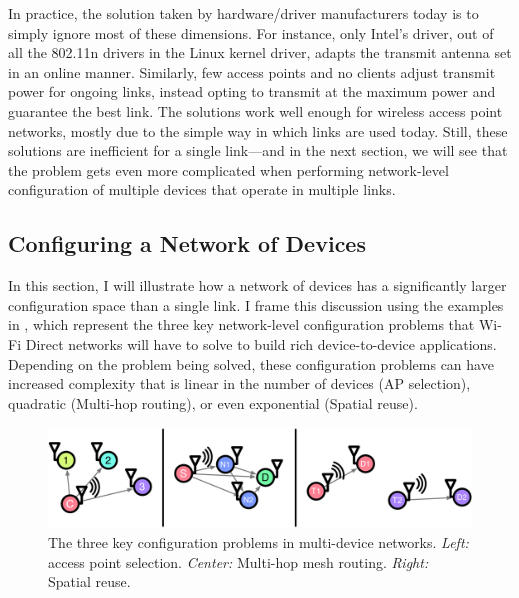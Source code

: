 In practice, the solution taken by hardware/driver manufacturers today is to simply ignore most of these dimensions. For instance, only Intel's  driver, out of all the 802.11n drivers in the Linux kernel driver, adapts the transmit antenna set in an online manner. Similarly, few access points and no clients adjust transmit power for ongoing links, instead opting to transmit at the maximum power and guarantee the best link. The solutions work well enough for wireless access point networks, mostly due to the simple way in which links are used today. Still, these solutions are inefficient for a single link---and in the next section, we will see that the problem gets even more complicated when performing network-level configuration of multiple devices that operate in multiple links.

\subsection{Configuring a Network of Devices}
\label{sec:intro_network_problems}
In this section, I will illustrate how a network of devices has a significantly larger configuration space than a single link. I frame this discussion using the examples in , which represent the three key network-level configuration problems that Wi-Fi Direct networks will have to solve to build rich device-to-device applications. Depending on the problem being solved, these configuration problems can have increased complexity that is linear in the number of devices (AP selection), quadratic (Multi-hop routing), or even exponential (Spatial reuse).

\begin{figure}[tp]
	\centering
	\includegraphics[width=\textwidth]{figures/network}
	\caption[The three key configuration problems in multi-device networks]{\label{fig:network_examples} The three key configuration problems in multi-device networks. \textit{Left:} access point selection. \textit{Center:} Multi-hop mesh routing. \textit{Right:} Spatial reuse. }
\end{figure}

